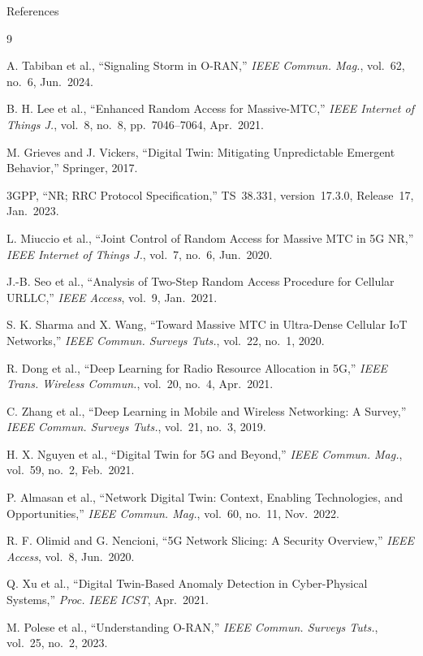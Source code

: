 \documentclass[aspectratio=169,t]{beamer}
\begin{document}
\begin{frame}[allowframebreaks]{References}
  \footnotesize
  \begin{thebibliography}{9}

  A. Tabiban et al.,
  ``Signaling Storm in O-RAN,''
  \emph{IEEE Commun. Mag.}, vol.~62, no.~6, Jun.~2024.

  B. H. Lee et al.,
  ``Enhanced Random Access for Massive-MTC,''
  \emph{IEEE Internet of Things J.}, vol.~8, no.~8, pp.~7046--7064, Apr.~2021.

  M. Grieves and J. Vickers,
  ``Digital Twin: Mitigating Unpredictable Emergent Behavior,''
  Springer, 2017.

  3GPP, ``NR; RRC Protocol Specification,'' TS~38.331, version~17.3.0, Release~17, Jan.~2023.

  L. Miuccio et al.,
  ``Joint Control of Random Access for Massive MTC in 5G NR,''
  \emph{IEEE Internet of Things J.}, vol.~7, no.~6, Jun.~2020.

  J.-B. Seo et al.,
  ``Analysis of Two-Step Random Access Procedure for Cellular URLLC,''
  \emph{IEEE Access}, vol.~9, Jan.~2021.

  S. K. Sharma and X. Wang,
  ``Toward Massive MTC in Ultra-Dense Cellular IoT Networks,''
  \emph{IEEE Commun. Surveys Tuts.}, vol.~22, no.~1, 2020.

  R. Dong et al.,
  ``Deep Learning for Radio Resource Allocation in 5G,''
  \emph{IEEE Trans. Wireless Commun.}, vol.~20, no.~4, Apr.~2021.

  C. Zhang et al.,
  ``Deep Learning in Mobile and Wireless Networking: A Survey,''
  \emph{IEEE Commun. Surveys Tuts.}, vol.~21, no.~3, 2019.

  H. X. Nguyen et al.,
  ``Digital Twin for 5G and Beyond,''
  \emph{IEEE Commun. Mag.}, vol.~59, no.~2, Feb.~2021.

  P. Almasan et al.,
  ``Network Digital Twin: Context, Enabling Technologies, and Opportunities,''
  \emph{IEEE Commun. Mag.}, vol.~60, no.~11, Nov.~2022.

  R. F. Olimid and G. Nencioni,
  ``5G Network Slicing: A Security Overview,''
  \emph{IEEE Access}, vol.~8, Jun.~2020.

  Q. Xu et al.,
  ``Digital Twin-Based Anomaly Detection in Cyber-Physical Systems,''
  \emph{Proc. IEEE ICST}, Apr.~2021.

  M. Polese et al.,
  ``Understanding O-RAN,''
  \emph{IEEE Commun. Surveys Tuts.}, vol.~25, no.~2, 2023.

  \end{thebibliography}
\end{frame}
\end{document}
